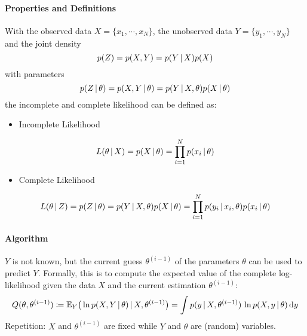				\paragraph{Properties and Definitions}
					With the observed data \( X = \{ x_1, \cdots, x_N \} \), the unobserved data \( Y = \{ y_1, \cdots, y_N \} \) and the joint density
					\begin{equation}
						p(Z) = p(X, Y) = p(Y \,\vert\, X) p(X)
					\end{equation}
					with parameters
					\begin{equation}
						p(Z \,\vert\, \theta) = p(X, Y \,\vert\, \theta) = p(Y \,\vert\, X, \theta) p(X \,\vert\, \theta)
					\end{equation}
					the incomplete and complete likelihood can be defined as:
					\begin{itemize}
						\item Incomplete Likelihood
					\end{itemize}
					\begin{equation}
						L(\theta \,\vert\, X) = p(X \,\vert\, \theta) = \prod_{i = 1}^{N} p(x_i \,\vert\, \theta)
					\end{equation}
					\begin{itemize}
						\item Complete Likelihood
					\end{itemize}
					\begin{equation}
						L(\theta \,\vert\, Z) = p(Z \,\vert\, \theta) = p(Y \,\vert\, X, \theta) p(X \,\vert\, \theta) = \prod_{i = 1}^{N} p(y_i \,\vert\, x_i, \theta) p(x_i \,\vert\, \theta)
					\end{equation}

				\paragraph{Algorithm}
					\(Y\) is not known, but the current guess \( \theta^{(i - 1)} \) of the parameters \(\theta\) can be used to predict \(Y\). Formally, this is to compute the expected value of the complete log-likelihood given the data \(X\) and the current estimation \(\theta^{(i - 1)}\):
					\begin{equation}
						Q(\theta, \theta^{(i - 1)}) \coloneqq \mathbb{E}_Y\big( \ln p(X, Y \,\vert\, \theta) \,\vert\, X, \theta^{(i - 1)} \big) = \int p(y \,\vert\, X, \theta^{(i - 1)}) \,\ln p(X, y \,\vert\, \theta) \dd{y}
					\end{equation}
					Repetition: \(X\) and \(\theta^{(i - 1)}\) are fixed while \(Y\) and \(\theta\) are (random) variables.

